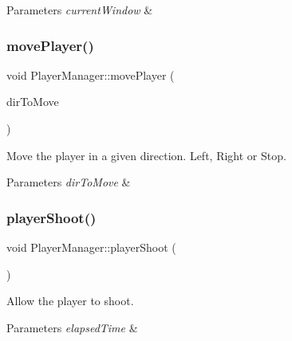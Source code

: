 \begin{DoxyParams}{Parameters}
{\em current\+Window} & \\
\hline
\end{DoxyParams}
\mbox{\label{class_player_manager_a95358a4f97cf343f5d5d01a440c5dc76}} 
\subsubsection{\texorpdfstring{move\+Player()}{movePlayer()}}
{\footnotesize\ttfamily void Player\+Manager\+::move\+Player (\begin{DoxyParamCaption}\item[{Move\+Direction}]{dir\+To\+Move }\end{DoxyParamCaption})}



Move the player in a given direction. Left, Right or Stop. 


\begin{DoxyParams}{Parameters}
{\em dir\+To\+Move} & \\
\hline
\end{DoxyParams}
\mbox{\label{class_player_manager_a7a61c6484a3dd12293d2481c5f61fb71}} 
\subsubsection{\texorpdfstring{player\+Shoot()}{playerShoot()}}
{\footnotesize\ttfamily void Player\+Manager\+::player\+Shoot (\begin{DoxyParamCaption}{ }\end{DoxyParamCaption})}



Allow the player to shoot. 


\begin{DoxyParams}{Parameters}
{\em elapsed\+Time} & \\
\hline
\end{DoxyParams}
\mbox{\label{class_player_manager_a171946405d72c219802315721e09467d}} 
